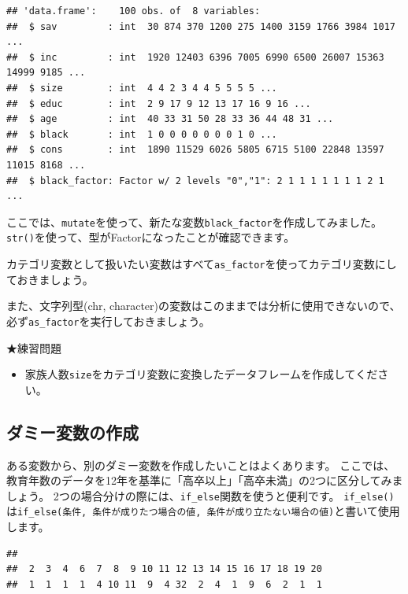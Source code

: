 \documentclass[]{book}
\newenvironment{Shaded}{\begin{snugshade}}{\end{snugshade}}
\newcommand{\KeywordTok}[1]{\textcolor[rgb]{0.13,0.29,0.53}{\textbf{#1}}}
\newcommand{\CommentTok}[1]{\textcolor[rgb]{0.56,0.35,0.01}{\textit{#1}}}
\newcommand{\OperatorTok}[1]{\textcolor[rgb]{0.81,0.36,0.00}{\textbf{#1}}}
\newcommand{\NormalTok}[1]{#1}
\providecommand{\tightlist}{%
  \setlength{\itemsep}{0pt}\setlength{\parskip}{0pt}}
\begin{document}
\begin{verbatim}
## 'data.frame':    100 obs. of  8 variables:
##  $ sav         : int  30 874 370 1200 275 1400 3159 1766 3984 1017 ...
##  $ inc         : int  1920 12403 6396 7005 6990 6500 26007 15363 14999 9185 ...
##  $ size        : int  4 4 2 3 4 4 5 5 5 5 ...
##  $ educ        : int  2 9 17 9 12 13 17 16 9 16 ...
##  $ age         : int  40 33 31 50 28 33 36 44 48 31 ...
##  $ black       : int  1 0 0 0 0 0 0 0 1 0 ...
##  $ cons        : int  1890 11529 6026 5805 6715 5100 22848 13597 11015 8168 ...
##  $ black_factor: Factor w/ 2 levels "0","1": 2 1 1 1 1 1 1 1 2 1 ...
\end{verbatim}

ここでは、\texttt{mutate}を使って、新たな変数\texttt{black\_factor}を作成してみました。
\texttt{str()}を使って、型がFactorになったことが確認できます。

カテゴリ変数として扱いたい変数はすべて\texttt{as\_factor}を使ってカテゴリ変数にしておきましょう。

また、文字列型(chr,
character)の変数はこのままでは分析に使用できないので、必ず\texttt{as\_factor}を実行しておきましょう。

★練習問題

\begin{itemize}
\tightlist
\item
  家族人数\texttt{size}をカテゴリ変数に変換したデータフレームを作成してください。
\end{itemize}

\subsection{ダミー変数の作成}\label{ux30c0ux30dfux30fcux5909ux6570ux306eux4f5cux6210}

ある変数から、別のダミー変数を作成したいことはよくあります。
ここでは、教育年数のデータを12年を基準に「高卒以上」「高卒未満」の2つに区分してみましょう。
2つの場合分けの際には、\texttt{if\_else}関数を使うと便利です。
\texttt{if\_else()}は\texttt{if\_else(条件,\ 条件が成りたつ場合の値,\ 条件が成り立たない場合の値)}と書いて使用します。

\begin{Shaded}
\end{Shaded}

\begin{verbatim}
## 
##  2  3  4  6  7  8  9 10 11 12 13 14 15 16 17 18 19 20 
##  1  1  1  1  4 10 11  9  4 32  2  4  1  9  6  2  1  1
\end{verbatim}
\end{document}
